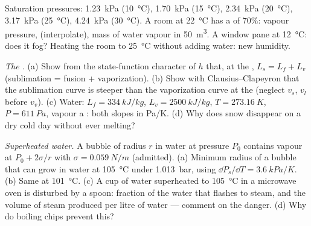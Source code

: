 \begin{exercise}[$\star\star$]\label{exo:b1:phase-changes:9}
Saturation pressures: \qty{1.23}{kPa} (\qty{10}{\degreeCelsius}), \qty{1.70}{kPa}
(\qty{15}{\degreeCelsius}), \qty{2.34}{kPa} (\qty{20}{\degreeCelsius}), \qty{3.17}{kPa}
(\qty{25}{\degreeCelsius}), \qty{4.24}{kPa} (\qty{30}{\degreeCelsius}). A room
at \qty{22}{\degreeCelsius} has a  of $70\%$: vapour
pressure,  (interpolate), mass of water vapour in
\qty{50}{m^3}. A window pane at \qty{12}{\degreeCelsius}: does it fog?
Heating the room to \qty{25}{\degreeCelsius} without adding water: new
humidity.
\end{exercise}

\begin{exercise}[$\star\star\star$]\label{exo:b1:phase-changes:10}
\emph{The .} (a) Show from the state-function character of
$h$ that, at the , $L_s = L_f + L_v$ (sublimation = fusion +
vaporization). (b) Show with Clausius--Clapeyron that the sublimation
curve is steeper than the vaporization curve at the 
(neglect $v_s$, $v_l$ before $v_v$). (c) Water: $L_f = \qty{334}{kJ/kg}$,
$L_v = \qty{2500}{kJ/kg}$, $T = \qty{273.16}{K}$, $P = \qty{611}{Pa}$, vapour a
: both slopes in \unit{Pa/K}. (d) Why does snow disappear
on a dry cold day without ever melting?
\end{exercise}

\begin{exercise}[$\star\star\star$]\label{exo:b1:phase-changes:11}
\emph{Superheated water.} A bubble of radius $r$ in water at pressure
$P_0$ contains vapour at $P_0 + 2\sigma/r$ with $\sigma = \qty{0.059}{N/m}$
(admitted). (a) Minimum radius of a bubble that can grow in water at
\qty{105}{\degreeCelsius} under \qty{1.013}{bar}, using
$\dd P_s/\dd T = \qty{3.6}{kPa/K}$. (b) Same at \qty{101}{\degreeCelsius}.
(c) A cup of water superheated to \qty{105}{\degreeCelsius} in a microwave
oven is disturbed by a spoon: fraction of the water that flashes to
steam, and the volume of steam produced per litre of water --- comment
on the danger. (d) Why do boiling chips prevent this?
\end{exercise}

